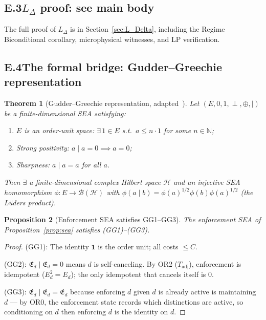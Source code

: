 \documentclass[11pt]{article}
\newtheorem{theorem}{Theorem}[section]
\newtheorem{proposition}[theorem]{Proposition}
\theoremstyle{remark}
\begin{document}
\subsection*{E.3\quad $L_\Delta$ proof: see main body}

The full proof of $L_\Delta$ is in Section~\ref{sec:L_Delta}, including the Regime Biconditional corollary, microphysical witnesses, and LP verification.

\subsection*{E.4\quad The formal bridge: Gudder--Greechie representation}

\begin{theorem}[Gudder--Greechie representation, adapted~\cite{GudderGreechie2002}]
\label{thm:gg}
Let $(E, 0, 1, \perp, \oplus, \mid)$ be a finite-dimensional SEA satisfying:
\begin{enumerate}[nosep,leftmargin=2em,itemsep=2pt]
  \item[(GG1)] $E$ is an order-unit space: $\exists\, 1 \in E$ s.t.\ $a \le n \cdot 1$ for some $n \in \mathbb{N}$;
  \item[(GG2)] Strong positivity: $a \mid a = 0 \implies a = 0$;
  \item[(GG3)] Sharpness: $a \mid a = a$ for all $a$.
\end{enumerate}
Then $\exists$ a finite-dimensional complex Hilbert space $\mathcal{H}$ and an injective SEA homomorphism $\phi: E \to \mathcal{B}(\mathcal{H})$ with $\phi(a \mid b) = \phi(a)^{1/2}\phi(b)\phi(a)^{1/2}$ (the L\"{u}ders product).
\end{theorem}

\begin{proposition}[Enforcement SEA satisfies GG1--GG3]
\label{prop:gg_hyps}
The enforcement SEA of Proposition~\ref{prop:sea} satisfies (GG1)--(GG3).
\end{proposition}

\begin{proof}
(GG1): The identity $\mathbf{1}$ is the order unit; all costs $\le C$.

(GG2): $\mathfrak{E}_d \mid \mathfrak{E}_d = 0$ means $d$ is self-canceling.  By OR2 ($T_{\mathrm{adj}}$), enforcement is idempotent ($E_d^2 = E_d$); the only idempotent that cancels itself is $0$.

(GG3): $\mathfrak{E}_d \mid \mathfrak{E}_d = \mathfrak{E}_d$ because enforcing $d$ given $d$ is already active is maintaining $d$ --- by OR0, the enforcement state records which distinctions are active, so conditioning on $d$ then enforcing $d$ is the identity on $d$.
\end{proof}
\end{document}
